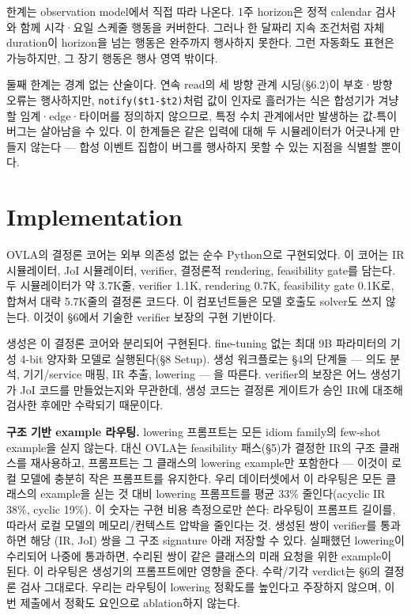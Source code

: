 \documentclass[sigconf,nonacm,anonymous,review]{acmart}
\begin{document}
한계는 observation model에서 직접 따라 나온다. 1주 horizon은 정적 calendar 검사와 함께 시각·요일 스케줄 행동을 커버한다. 그러나 한 달짜리 지속 조건처럼 자체 duration이 horizon을 넘는 행동은 완주까지 행사하지 못한다. 그런 자동화도 표현은 가능하지만, 그 장기 행동은 행사 영역 밖이다.

둘째 한계는 경계 없는 산술이다. 연속 read의 세 방향 관계 시딩(\S6.2)이 부호·방향 오류는 행사하지만, \texttt{notify(\$t1-\$t2)}처럼 값이 인자로 흘러가는 식은 합성기가 겨냥할 임계·edge·타이머를 정의하지 않으므로, 특정 수치 관계에서만 발생하는 값-특이 버그는 살아남을 수 있다. 이 한계들은 같은 입력에 대해 두 시뮬레이터가 어긋나게 만들지 않는다 — 합성 이벤트 집합이 버그를 행사하지 못할 수 있는 지점을 식별할 뿐이다.

\section{Implementation}

OVLA의 결정론 코어는 외부 의존성 없는 순수 Python으로 구현되었다. 이 코어는 IR 시뮬레이터, JoI 시뮬레이터, verifier, 결정론적 rendering, feasibility gate를 담는다. 두 시뮬레이터가 약 3.7K줄, verifier 1.1K, rendering 0.7K, feasibility gate 0.1K로, 합쳐서 대략 5.7K줄의 결정론 코드다. 이 컴포넌트들은 모델 호출도 solver도 쓰지 않는다. 이것이 \S6에서 기술한 verifier 보장의 구현 기반이다.

생성은 이 결정론 코어와 분리되어 구현된다. fine-tuning 없는 최대 9B 파라미터의 기성 4-bit 양자화 모델로 실행된다(\S8 Setup). 생성 워크플로는 \S4의 단계들 — 의도 분석, 기기/service 매핑, IR 추출, lowering — 을 따른다. verifier의 보장은 어느 생성기가 JoI 코드를 만들었는지와 무관한데, 생성 코드는 결정론 게이트가 승인 IR에 대조해 검사한 후에만 수락되기 때문이다.

\textbf{구조 기반 example 라우팅.} lowering 프롬프트는 모든 idiom family의 few-shot example을 싣지 않는다. 대신 OVLA는 feasibility 패스(\S5)가 결정한 IR의 구조 클래스를 재사용하고, 프롬프트는 그 클래스의 lowering example만 포함한다 — 이것이 로컬 모델에 충분히 작은 프롬프트를 유지한다. 우리 데이터셋에서 이 라우팅은 모든 클래스의 example을 싣는 것 대비 lowering 프롬프트를 평균 33\% 줄인다(acyclic IR 38\%, cyclic 19\%). 이 숫자는 구현 비용 측정으로만 쓴다: 라우팅이 프롬프트 길이를, 따라서 로컬 모델의 메모리/컨텍스트 압박을 줄인다는 것. 생성된 쌍이 verifier를 통과하면 해당 (IR, JoI) 쌍을 그 구조 signature 아래 저장할 수 있다. 실패했던 lowering이 수리되어 나중에 통과하면, 수리된 쌍이 같은 클래스의 미래 요청을 위한 example이 된다. 이 라우팅은 생성기의 프롬프트에만 영향을 준다. 수락/기각 verdict는 \S6의 결정론 검사 그대로다. 우리는 라우팅이 lowering 정확도를 높인다고 주장하지 않으며, 이번 제출에서 정확도 요인으로 ablation하지 않는다.
\end{document}
